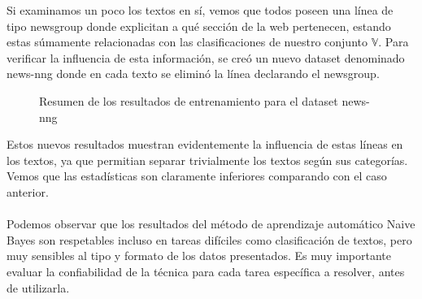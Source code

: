 \documentclass[a4paper,10pt]{article}
\begin{document}
Si examinamos un poco los textos en sí, vemos que todos poseen una línea de tipo \textsf{newsgroup} donde explicitan a qué sección de la web pertenecen, estando estas súmamente relacionadas con las clasificaciones de nuestro conjunto $\mathbb{V}$. Para verificar la influencia de esta información, se creó un nuevo dataset denominado \textsf{news-nng} donde en cada texto se eliminó la línea declarando el newsgroup.

\vspace{5pt}

\begin{multicols}{2}

\begin{figure}[H]
\centering

\caption{Resumen de los resultados de entrenamiento para el dataset \textsf{news-nng}}
\end{figure}

Estos nuevos resultados muestran evidentemente la influencia de estas líneas en los textos, ya que permitian separar trivialmente los textos según sus categorías. Vemos que las estadísticas son claramente inferiores comparando con el caso anterior.   

\paragraph{}
Podemos observar que los resultados del método de aprendizaje automático \textsf{Naive Bayes} son respetables incluso en tareas difíciles como clasificación de textos, pero muy sensibles al tipo y formato de los datos presentados. Es muy importante evaluar la confiabilidad de la técnica para cada tarea específica a resolver, antes de utilizarla.
\end{multicols}
\end{document}
